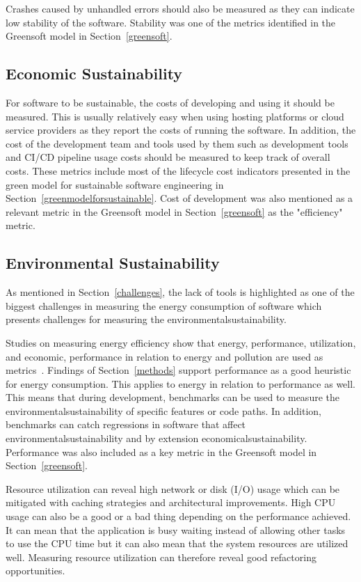 Crashes caused by unhandled errors should also be measured as they can indicate low stability of the software. Stability was one of the metrics identified in the Greensoft model in Section~\ref{greensoft}.

\subsection{Economic Sustainability}
For software to be sustainable, the costs of developing and using it should be measured. This is usually relatively easy when using hosting platforms or cloud service providers as they report the costs of running the software. In addition, the cost of the development team and tools used by them such as development tools and CI/CD pipeline usage costs should be measured to keep track of overall costs. These metrics include most of the lifecycle cost indicators presented in the green model for sustainable software engineering in Section~\ref{greenmodelforsustainable}. Cost of development was also mentioned as a relevant metric in the Greensoft model in Section~\ref{greensoft} as the "efficiency" metric.

\subsection{Environmental Sustainability}
As mentioned in Section~\ref{challenges}, the lack of tools is highlighted as one of the biggest challenges in measuring the energy consumption of software which presents challenges for measuring the \gls{environmentalsustainability}.

Studies on measuring energy efficiency show that energy, performance, utilization, and economic, performance in relation to energy and pollution are used as metrics~\cite{slronmetrics}. Findings of Section~\ref{methods} support performance as a good heuristic for energy consumption. This applies to energy in relation to performance as well. This means that during development, benchmarks can be used to measure the \gls{environmentalsustainability} of specific features or code paths. In addition, benchmarks can catch regressions in software that affect \gls{environmentalsustainability} and by extension \gls{economicalsustainability}. Performance was also included as a key metric in the Greensoft model in Section~\ref{greensoft}.

Resource utilization can reveal high network or disk (I/O) usage which can be mitigated with caching strategies and architectural improvements. High CPU usage can also be a good or a bad thing depending on the performance achieved. It can mean that the application is busy waiting instead of allowing other tasks to use the CPU time but it can also mean that the system resources are utilized well. Measuring resource utilization can therefore reveal good refactoring opportunities.

